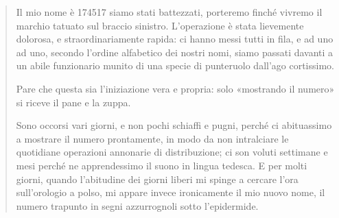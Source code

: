 \documentclass[a4paper, twoside, titlepage]{book}
\newcounter{mar}
\newcommand{\citazione}[1]{%
  \begin{quotation}
  \begin{linenumbers}
  \modulolinenumbers[5]
  \begingroup
  \setlength{\parindent}{0cm}
  \noindent #1
  \endgroup
  \end{linenumbers}
  \end{quotation}\setcounter{linenumber}{1}
  }
\begin{document}
\citazione{ Il mio nome è 174517 siamo stati battezzati, porteremo finché vivremo il marchio tatuato sul braccio sinistro.
L'operazione è stata lievemente dolorosa, e straordinariamente rapida: ci hanno messi tutti in fila, e ad uno ad uno, secondo l'ordine alfabetico dei nostri nomi, siamo passati davanti a un abile funzionario munito di una specie di punteruolo dall'ago cortissimo.

Pare che questa sia l'iniziazione vera e propria: solo «mostrando il numero» si riceve il pane e la zuppa.

Sono occorsi vari giorni, e non pochi schiaffi e pugni, perché ci abituassimo a mostrare il numero prontamente, in modo da non intralciare le quotidiane operazioni annonarie di distribuzione; ci son voluti settimane e mesi perché ne apprendessimo il suono in lingua tedesca. E per molti giorni, quando l'abitudine dei giorni liberi mi spinge a cercare l'ora sull'orologio a polso, mi appare invece ironicamente il mio nuovo nome, il numero trapunto in segni azzurrognoli sotto l'epidermide.}
\end{document}
